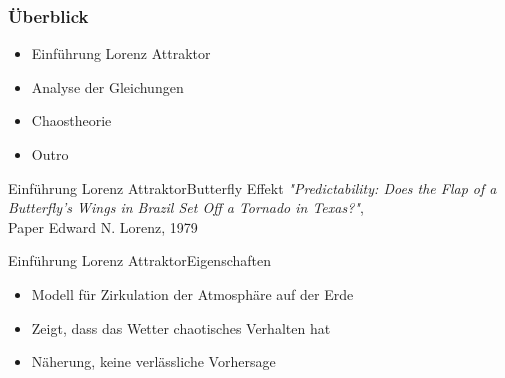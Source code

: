 \documentclass[presentation.tex]{subfiles}
\begin{document}
	\frame{\titlepage}
    
    \begin{frame}
        \frametitle{Überblick}
        \begin{itemize}
            \item Einführung Lorenz Attraktor
            \item Analyse der Gleichungen
            \item Chaostheorie
            \item Outro
        \end{itemize}
    \end{frame}
    
    \begin{frame}{Einführung Lorenz Attraktor}{Butterfly Effekt}
		\textit{"Predictability: Does the Flap of a Butterfly's Wings in Brazil Set Off a Tornado in Texas?"}, \\
		Paper Edward N. Lorenz, 1979
    \end{frame}
    
    \begin{frame}{Einführung Lorenz Attraktor}{Eigenschaften}
    	\begin{itemize}
    		\item Modell für Zirkulation der Atmosphäre auf der Erde
    		\item Zeigt, dass das Wetter chaotisches Verhalten hat
    		\item Näherung, keine verlässliche Vorhersage
    	\end{itemize}
    \end{frame}
    
\end{document}

